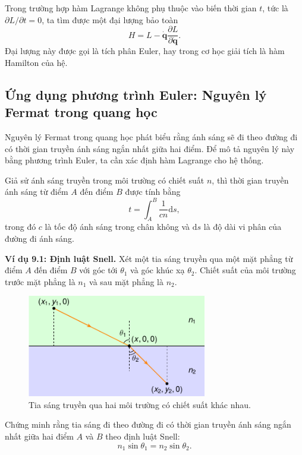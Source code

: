 Trong trường hợp hàm Lagrange không phụ thuộc vào biến thời gian \(t\), tức là \(\partial L/\partial t = 0\), ta tìm được một đại lượng bảo toàn
\begin{equation}
    H = L - \mathbf{\dot{q}} \dfrac{\partial L}{\partial \mathbf{\dot{q}}}.
\end{equation}
Đại lượng này được gọi là tích phân Euler, hay trong cơ học giải tích là hàm Hamilton của hệ.

\subsection{Ứng dụng phương trình Euler: Nguyên lý Fermat trong quang học}

Nguyên lý Fermat trong quang học phát biểu rằng ánh sáng sẽ đi theo đường đi có thời gian truyền ánh sáng ngắn nhất giữa hai điểm. Để mô tả nguyên lý này bằng phương trình Euler, ta cần xác định hàm Lagrange cho hệ thống.

Giả sử ánh sáng truyền trong môi trường có chiết suất \(n\), thì thời gian truyền ánh sáng từ điểm \(A\) đến điểm \(B\) được tính bằng
\begin{equation}
    t = \int_{A}^{B} \frac{1}{c n}\mathrm{d}s,
\end{equation}
trong đó \(c\) là tốc độ ánh sáng trong chân không và \(\mathrm{d}s\) là độ dài vi phân của đường đi ánh sáng.

\textbf{Ví dụ 9.1: Định luật Snell.} Xét một tia sáng truyền qua một mặt phẳng từ điểm \(A\) đến điểm \(B\) với góc tới \(\theta_1\) và góc khúc xạ \(\theta_2\). Chiết suất của môi trường trước mặt phẳng là \(n_1\) và sau mặt phẳng là \(n_2\). 

\begin{figure}[!h]
    \centering
    \includegraphics[width=0.7\textwidth]{Tuan9/Figures/Snellius_law.pdf}
    \caption{Tia sáng truyền qua hai môi trường có chiết suất khác nhau.}
    \label{fig:Snell_law}
\end{figure}
Chứng minh rằng tia sáng đi theo đường đi có thời gian truyền ánh sáng ngắn nhất giữa hai điểm \(A\) và \(B\) theo định luật Snell:
\begin{equation}
    n_1 \sin \theta_1 = n_2 \sin \theta_2.
\end{equation}

